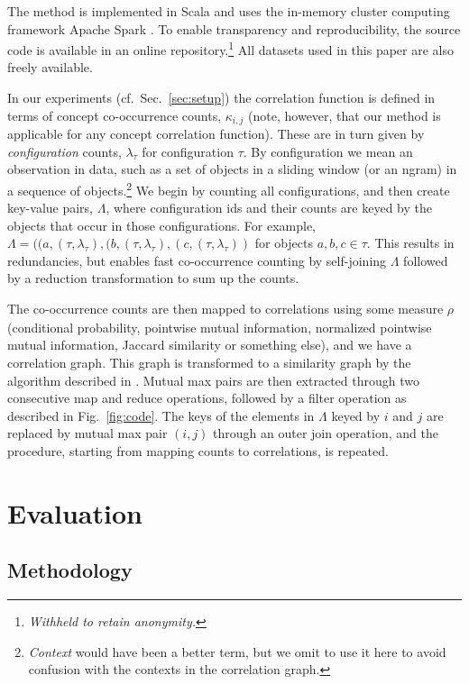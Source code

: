\documentclass[conference]{IEEEtran}
\newcommand{\anonymize}[1]{\emph{Withheld to retain anonymity.}}
\newcommand{\fig}[1]{Fig.\ \ref{#1}}
\newcommand{\sn}[1]{Sec.\ \ref{#1}}
\newcommand{\rn}[1]{\rho_{#1}}
\begin{document}
The method is implemented in Scala and uses the in-memory cluster computing framework Apache Spark \cite{Zaharia-2012}.
To enable transparency and reproducibility, the source code is available in an online 
repository.\footnote{\anonymize{https://github.com/sics-dna/hierarchical-concepts}} All datasets used in this paper are also
freely available.

In our experiments (cf.\ \sn{sec:setup}) the correlation function is defined in terms of concept co-occurrence counts, $\kappa_{i,j}$
(note, however, that our method is applicable for any concept correlation function).
These are in turn given by \emph{configuration} counts, $\lambda_{\tau}$ for configuration $\tau$.  
By configuration we mean an observation in data, such as a set of objects in a sliding window (or an ngram) 
in a sequence of objects.\footnote{\emph{Context} would have been a better term, but we omit to use it here to avoid confusion 
with the contexts in the correlation graph.} 
We begin by counting all configurations, and then create key-value pairs, $\Lambda$, where configuration ids and their counts are keyed by
the objects that occur in those configurations. For example, 
$\Lambda = ((a, (\tau, \lambda_{\tau}), (b, (\tau, \lambda_{\tau}), (c, (\tau, \lambda_{\tau}))$ for objects $a,b,c \in \tau$. 
This results in redundancies, but enables fast co-occurrence counting by self-joining $\Lambda$ followed 
by a reduction transformation to sum up the counts. 

The co-occurrence counts are then mapped to correlations using some measure $\rn{}$
(conditional probability, pointwise mutual information, normalized pointwise mutual information, Jaccard similarity or something else),
and we have a correlation graph. This graph is transformed to a similarity graph by the algorithm described in \cite{Gornerup15}. 
Mutual max pairs are then extracted through two consecutive map and reduce operations, followed by a filter operation as described in \fig{fig:code}.
The keys of the elements in $\Lambda$ keyed by $i$ and $j$ are replaced by mutual max pair $(i, j)$ through an outer join operation,
and the procedure, starting from mapping counts to correlations, is repeated.

\section{Evaluation}
\label{sec:evaluation}

\subsection{Methodology}
\label{sec:methodology}
\end{document}
